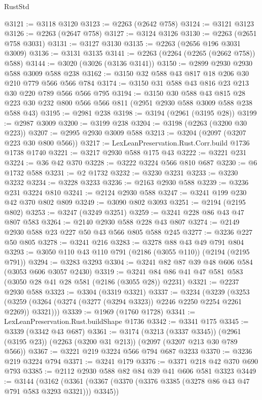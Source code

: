 \begin{lexlean}{RustStd}
\begin{coremodule}
{\begin{coremodule}
{{{{{{{{{{{{{{{@3121 := @3118 @3120
@3123 := @2263 (@2642 @758)
@3124 := @3121 @3123
@3126 := @2263 (@2647 @758)
@3127 := @3124 @3126
@3130 := @2263 (@2651 @758 @3031)
@3131 := @3127 @3130
@3135 := @2263 (@2656 @196 @3031 @3009)
@3136 := @3131 @3135
@3141 := @2263 (@2264 (@2265 (@2662 @758)) @588)
@3144 := @3020 (@3026 (@3136 @3141))
@3150 := @2899 @2930 @2930 @588 @3009 @588 @238
@3162 := @3150 @32 @588 @43 @817 @18 @206 @30 @210 @779 @566 @566 @784
@3174 := @3150 @31 @588 @43 @816 @23 @213 @30 @220 @789 @566 @566 @795
@3194 := @3150
    @30
    @588
    @43
    @815
    @28
    @223
    @30
    @232
    @800
    @566
    @566
    @811
    (@2951 @2930 @588 @3009 @588 @238 @588 @43)
@3195 := @2981 @238
@3198 := @3194 (@2961 (@3195 @28))
@3199 := @2987 @3009
@3200 := @3199 @238
@3204 := @3198 (@2263 (@3200 @30 @223))
@3207 := @2995 @2930 @3009 @588
@3213 := @3204 (@2097 (@3207 @223 @30 @800 @566))
@3217 := LexLeanPreservation.Rust.Corr.build @1736 @1738 @1740
@3221 := @3217 @2930 @588 @175 @43
@3222 := @3221 @231
@3224 := @36 @42 @370
@3228 := @3222 @3224 @566 @810 @687
@3230 := @6 @1732 @588
@3231 := @2 @1732
@3232 := @3230 @3231
@3233 := @3230 @3232
@3234 := @3228 @3233
@3236 := @2163 @2930 @588
@3239 := @3236 @231 @3224 @810
@3241 := @2124 @2930 @588
@3247 := @3241 @199 @230 @42 @370 @802 @809
@3249 := @3090 @802 @3093
@3251 := @2194 (@2195 @802)
@3253 := @3247 (@3249 @3251)
@3259 := @3241 @228 @86 @43 @47 @807 @583
@3264 := @2140 @2930 @588 @228 @43 @807
@3274 := @2149 @2930 @588 @23 @227 @50 @43 @566 @805 @588 @245
@3277 := @3236 @227 @50 @805
@3278 := @3241 @216
@3283 := @3278 @88 @43 @49 @791 @804
@3293 := @3050 @110 @43 @110 @791 (@2186 (@3055 @110)) (@2194 (@2195 @791))
@3294 := @3283 @3293
@3304 := @3241 @82 @87 @39 @48 @606 @584 (@3053 @606 @3057 @2430)
@3319 := @3241 @84 @86 @41 @47 @581 @583 (@3050 @28 @41 @28 @581 (@2186 (@3055 @28)) @2231)
@3321 := @2237 @2930 @588
@3323 := @3304 (@3319 @3321)
@3337 := @3234
    (@3239
      (@3253 (@3259 (@3264 (@3274 (@3277 (@3294 @3323)) @2246 @2250 @2254 @2261 @2269)) @3321)))
@3339 := @1969 (@1760 @1728)
@3341 := LexLeanPreservation.Rust.buildShape @1736
@3342 := @3341 @175
@3345 := @3339 (@3342 @43 @687)
@3361 := @3174
    (@3213 (@3337 @3345))
    (@2961 (@3195 @23))
    (@2263 (@3200 @31 @213))
    (@2097 (@3207 @213 @30 @789 @566))
@3367 := @3221 @219 @3224 @566 @794 @687 @3233
@3370 := @3236 @219 @3224 @794
@3371 := @3241 @179
@3376 := @3371 @218 @42 @370 @690 @793
@3385 := @2112 @2930 @588 @82 @84 @39 @41 @606 @581 @3323
@3449 := @3144
    (@3162
      (@3361 (@3367 (@3370 (@3376 @3385 (@3278 @86 @43 @47 @791 @583 @3293 @3321))) @3345))
}}}}}}}}}}}}}}}
\end{coremodule}}
\end{coremodule}
\end{lexlean}
